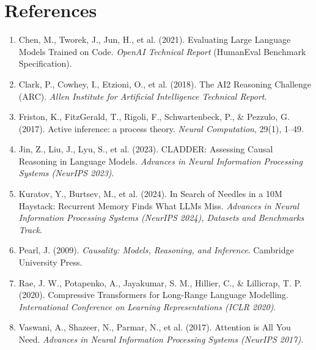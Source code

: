 \documentclass[11pt,a4paper]{article}
\begin{document}
\section*{References}
\footnotesize
\begin{enumerate}[leftmargin=1.5em, itemsep=0.5pt, topsep=1pt]
  \item Chen, M., Tworek, J., Jun, H., et al. (2021). Evaluating Large Language Models Trained on Code. \textit{OpenAI Technical Report} (HumanEval Benchmark Specification).
  \item Clark, P., Cowhey, I., Etzioni, O., et al. (2018). The AI2 Reasoning Challenge (ARC). \textit{Allen Institute for Artificial Intelligence Technical Report}.
  \item Friston, K., FitzGerald, T., Rigoli, F., Schwartenbeck, P., \& Pezzulo, G. (2017). Active inference: a process theory. \textit{Neural Computation}, 29(1), 1--49.
  \item Jin, Z., Liu, J., Lyu, S., et al. (2023). CLADDER: Assessing Causal Reasoning in Language Models. \textit{Advances in Neural Information Processing Systems (NeurIPS 2023)}.
  \item Kuratov, Y., Burtsev, M., et al. (2024). In Search of Needles in a 10M Haystack: Recurrent Memory Finds What LLMs Miss. \textit{Advances in Neural Information Processing Systems (NeurIPS 2024), Datasets and Benchmarks Track}.
  \item Pearl, J. (2009). \textit{Causality: Models, Reasoning, and Inference}. Cambridge University Press.
  \item Rae, J. W., Potapenko, A., Jayakumar, S. M., Hillier, C., \& Lillicrap, T. P. (2020). Compressive Transformers for Long-Range Language Modelling. \textit{International Conference on Learning Representations (ICLR 2020)}.
  \item Vaswani, A., Shazeer, N., Parmar, N., et al. (2017). Attention is All You Need. \textit{Advances in Neural Information Processing Systems (NeurIPS 2017)}.
\end{enumerate}

\vspace{0.2em}
\vspace{0.1em}

\clearpage

\end{document}
